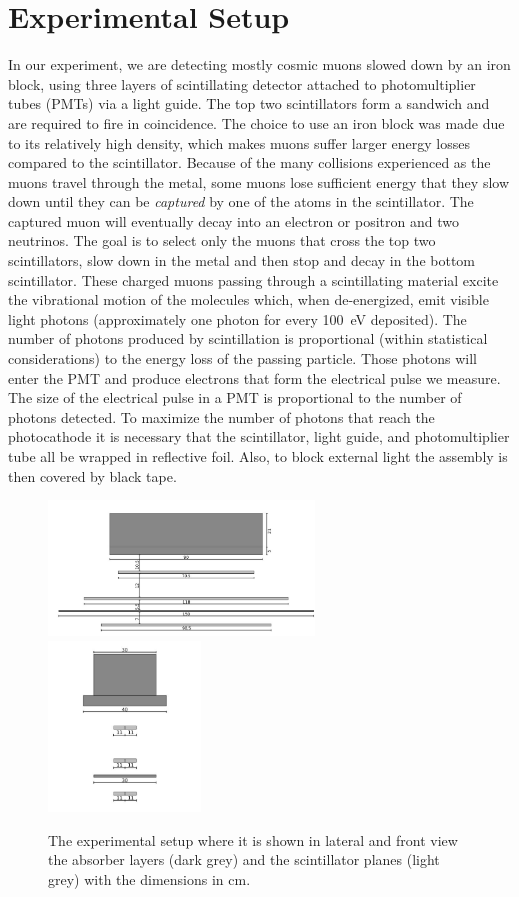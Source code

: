 \chapter{Experimental Setup}
\label{sec:setup}
In our experiment, we are detecting mostly cosmic muons slowed down by an iron block, 
using three layers of scintillating detector attached to photomultiplier tubes (PMTs)
via a light guide. The top two scintillators form a sandwich and are required to fire in
coincidence. The choice to use an iron block was made due to its relatively high density,
which makes muons suffer larger energy losses compared to the scintillator.
Because of the many collisions experienced as the muons travel through the metal,
some muons lose sufficient energy that they slow down until they can be \textit{captured}
by one of the atoms in the scintillator. 
The captured muon will eventually decay into an electron or positron and two neutrinos.
The goal is to select only the muons that cross the top two scintillators, 
slow down in the metal and then stop and decay in the bottom scintillator.
These charged muons passing through a scintillating material excite the vibrational motion 
of the molecules which, when de-energized, emit visible light photons (approximately one photon
for every \SI{100}{eV} deposited). The number of photons produced by scintillation 
is proportional (within statistical considerations) to the energy loss of the passing particle.
Those photons will enter the PMT and produce electrons that form the electrical pulse we measure.
The size of the electrical pulse in a PMT is proportional to the number of photons detected.
To maximize the number of photons that reach the photocathode it is necessary that the scintillator,
light guide, and photomultiplier tube all be wrapped in reflective foil. Also, to block external 
light the assembly is then covered by black tape.
	\begin{figure}
		\centering
		\includegraphics[width=0.63\textwidth]{figures/11.png}
		\includegraphics[width=0.36\textwidth]{figures/22.png}
		\caption{The experimental setup where it is shown in lateral and front view the absorber layers (dark grey) and the scintillator planes (light grey) with the dimensions in cm.}
		\label{fig:Scintillators_Detectors}
	\end{figure}
